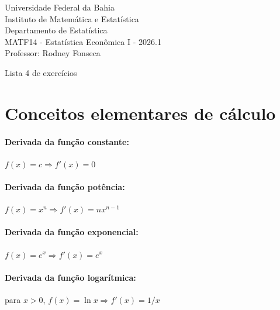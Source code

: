 \documentclass{article}
\date{--/--/----} %
\begin{document}
\begin{flushleft}
	Universidade Federal da Bahia\\
	Instituto de Matemática e Estatística\\
	Departamento de Estatística\\
	MATF14 - Estatística Econômica I - 2026.1\\
	Professor: Rodney Fonseca \\
\end{flushleft}

\begin{center}
	\begin{Large}
		Lista 4 de exercícios \\
	\end{Large}	
\end{center}



\vspace{1em}

\section*{Conceitos elementares de cálculo}

\paragraph{Derivada da função constante:} $f(x) = c \Rightarrow f'(x) = 0$

\paragraph{Derivada da função potência:} $f(x) = x^n \Rightarrow f'(x) = n x^{n-1}$

\paragraph{Derivada da função exponencial:} $f(x) = e^x \Rightarrow f'(x) = e^x$

\paragraph{Derivada da função logarítmica:} para $x>0$, $f(x) = \ln x \Rightarrow f'(x) = 1/x$
\end{document}
